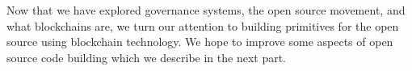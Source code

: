 \null\vfill
\drawBackground
\startBackground
\begin{fullwidth}
  Now that we have explored governance systems, the open source movement, and what blockchains are, we turn our attention to building primitives for the open source using blockchain technology.
  We hope to improve some aspects of open source code building which we describe in the next part.
\end{fullwidth}
\vspace*{2mm}
\stopBackground
\vfill\null

